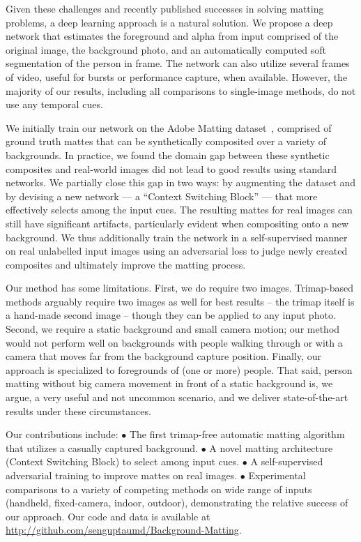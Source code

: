 \documentclass[10pt,twocolumn,letterpaper]{article}
\begin{document}
Given these challenges and recently published successes in solving matting problems, a deep learning approach is a natural solution.  We propose a deep network that estimates the foreground and alpha from input comprised of the original image, the background photo, and an automatically computed soft segmentation of the person in frame.  The network can also utilize several frames of video, useful for bursts or performance capture, when available. However, the majority of our results, including all comparisons to single-image methods, do not use any temporal cues.

We initially train our network on the Adobe Matting dataset~\cite{xu2017deep}, comprised of ground truth mattes that can be synthetically composited over a variety of backgrounds.  In practice, we found the domain gap between these synthetic composites and real-world images did not lead to good results using standard networks.  We partially close this gap in two ways: by augmenting the dataset and by devising a new network — a “Context Switching Block” — that more effectively selects among the input cues.  The resulting mattes for real images can still have significant artifacts, particularly evident when compositing onto a new background.  We thus additionally train the network in a self-supervised manner on real unlabelled input images using an adversarial loss to judge newly created composites and ultimately improve the matting process.

Our method has some limitations.  First, we do require two images.  Trimap-based methods arguably require two images as well for best results -- the trimap itself is a hand-made second image -- though they can be applied to any input photo.  Second, we require a static background and small camera motion; our method would not perform well on backgrounds with people walking through or with a camera that moves far from the background capture position.  Finally, our approach is specialized to foregrounds of (one or more) people.
That said, person matting without big camera movement in front of a static background is, we argue, a very useful and not uncommon scenario, and we deliver state-of-the-art results under these circumstances.



Our contributions include: $\bullet$ The first trimap-free automatic matting algorithm that utilizes a casually captured background. $\bullet$ A novel matting architecture (Context Switching Block) to select among input cues. $\bullet$ A self-supervised adversarial training to improve mattes on real images. $\bullet$ Experimental comparisons to a variety of competing methods on wide range of inputs (handheld, fixed-camera, indoor, outdoor), demonstrating the relative success of our approach. Our code and data is available at {\footnotesize \url{http://github.com/senguptaumd/Background-Matting}}.
\end{document}
